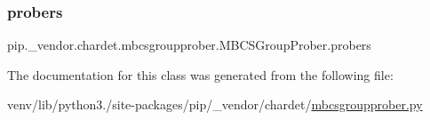 \subsubsection{\texorpdfstring{probers}{probers}}
{\footnotesize\ttfamily pip.\+\_\+vendor.\+chardet.\+mbcsgroupprober.\+M\+B\+C\+S\+Group\+Prober.\+probers}



The documentation for this class was generated from the following file\+:\begin{DoxyCompactItemize}
\item 
venv/lib/python3./site-\/packages/pip/\+\_\+vendor/chardet/\hyperlink{mbcsgroupprober_8py}{mbcsgroupprober.\+py}\end{DoxyCompactItemize}
